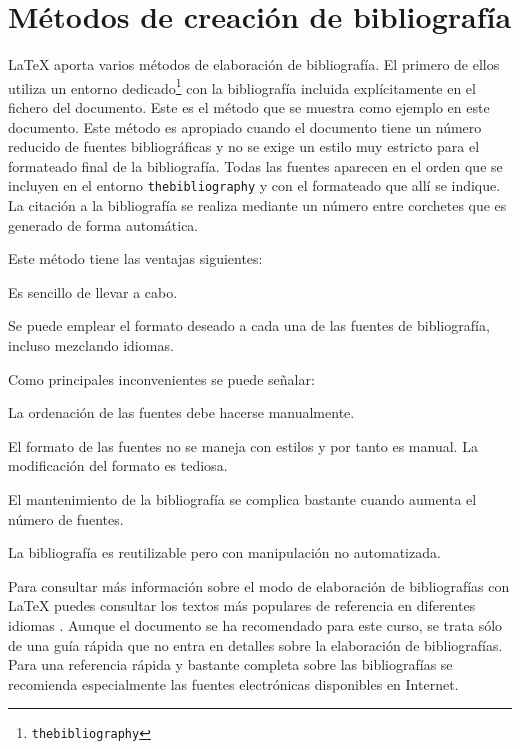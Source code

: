 \documentclass[11pt,a4paper]{article}
\begin{document}
\section{Métodos de creación de bibliografía}
\LaTeX{} aporta varios métodos de elaboración de bibliografía. El primero de ellos utiliza un entorno dedicado\footnote{ \texttt{thebibliography}} con la bibliografía incluida explícitamente en el fichero del documento. Este es el método que se muestra como ejemplo en este documento. Este método es apropiado cuando el documento tiene un número reducido de fuentes bibliográficas y no se exige un estilo muy estricto para el formateado final de la bibliografía. Todas las fuentes aparecen en el orden que se incluyen en el entorno \texttt{thebibliography} y con el formateado que allí se indique. La citación a la bibliografía se realiza mediante un número entre corchetes que es generado de forma automática.
	

\noindent Este método tiene las ventajas siguientes:
\begin{dinglist}{51}
	\item Es sencillo de llevar a cabo.
	
	\item Se puede emplear el formato deseado a cada una de las fuentes de bibliografía, incluso mezclando idiomas.
\end{dinglist}

\noindent Como principales inconvenientes se puede señalar:
\begin{dinglist}{55}
	\item La ordenación de las fuentes debe hacerse manualmente.
	
	\item El formato de las fuentes no se maneja con estilos y por tanto es manual. La modificación del formato es tediosa.
	
	\item El mantenimiento de la bibliografía se complica bastante cuando aumenta el número de fuentes.
	
	\item La bibliografía es reutilizable pero con manipulación no automatizada.
\end{dinglist}



Para consultar más información sobre el modo de elaboración de bibliografías con \LaTeX{} puedes consultar los textos más populares de referencia en diferentes idiomas \cite[en inglés]{KopDal2003,Lam1994,MitGooBra2004} \cite[en español]{CasLucMir2000,CasLucMir2003}. Aunque el documento \cite{lshort2009} se ha recomendado para este curso, se trata sólo de una guía rápida que no entra en detalles sobre la elaboración de bibliografías. Para una referencia rápida y bastante completa sobre las bibliografías se recomienda especialmente las fuentes electrónicas \cite{Rob2010,wiki2010} disponibles en Internet.
\end{document}

